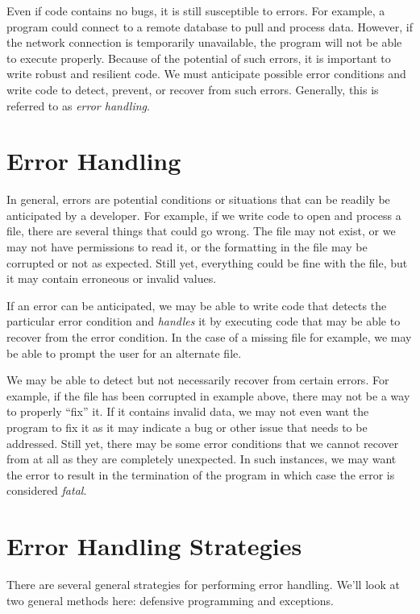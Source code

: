 Even if code contains no bugs, it is still susceptible to
errors.  For example, a program could connect to a 
remote database to pull and process data.  However, if
the network connection is temporarily unavailable, the
program will not be able to execute properly.  Because
of the potential of such errors, it is important to write
robust and resilient code.  We must anticipate possible 
error conditions and write code to detect, prevent, or 
recover from such errors.  Generally, this is referred to 
as \emph{error handling}.

\section{Error Handling}

In general, errors are potential conditions or situations 
that can be readily be anticipated by a developer.  For
example, if we write code to open and process a file, 
there are several things that could go wrong.  The file
may not exist, or we may not have permissions to read
it, or the formatting in the file may be corrupted or not
as expected.  Still yet, everything could be fine with the
file, but it may contain erroneous or invalid values.

If an error can be anticipated, we may be able to write
code that detects the particular error condition and
\emph{handles} it by executing code that may be
able to recover from the error condition.  In the case of
a missing file for example, we may be able to prompt the 
user for an alternate file.  

We may be able to detect but not necessarily recover from
certain errors.  For example, if the file has been corrupted
in example above, there may not be a way to properly 
``fix'' it.  If it contains invalid data, we may not even want
the program to fix it as it may indicate a bug or other issue
that needs to be addressed.  Still yet, there may be some
error conditions that we cannot recover from at all as they
are completely unexpected.  In such instances, we may
want the error to result in the termination of the program
in which case the error is considered \emph{fatal}.  

\section{Error Handling Strategies}

There are several general strategies for performing error
handling.  We'll look at two general methods here: defensive
programming and exceptions.


